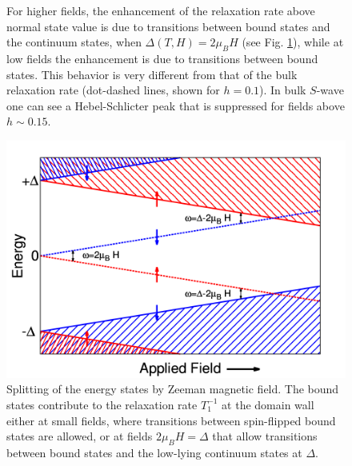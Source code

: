 \documentclass[prb,aps,showpacs,amsmath,twocolumn,10pt]{revtex4-1}
\newcommand{\blue}{\textcolor{blue}}
\newcommand{\red}{\textcolor{red}}
\begin{document}
\begin{figure}
{%
For higher fields, the enhancement of the relaxation rate above normal state value is due to transitions between 
bound states and the continuum states, when $\Delta(T,H) = 2 \mu_B H$ (see Fig. \ref{fig:rel_trans}), while at low fields the enhancement is due to transitions between bound states. This behavior is very different from that of the bulk relaxation rate (dot-dashed lines, shown for $h=0.1$). In bulk $S$-wave one can see a Hebel-Schlicter peak that is suppressed for fields above $h\sim0.15$.
}
\end{figure}

\begin{figure}
\includegraphics[scale=0.25]{./Fig5} 
\caption{\label{fig:rel_trans}
\quad Splitting of the energy states by Zeeman magnetic field. The bound states contribute to the relaxation rate 
$T_1^{-1}$ at the domain wall either at small fields, where transitions between spin-flipped bound states are allowed, 
or at fields $2\mu_B H = \Delta$ that allow transitions between bound states and the low-lying continuum 
states at $\Delta$. 
}
\end{figure}
\end{document}
